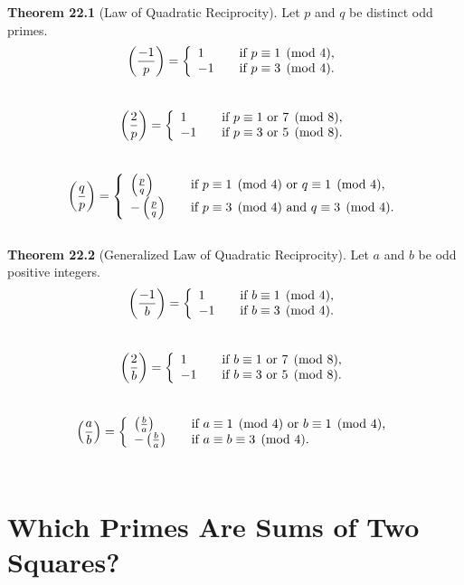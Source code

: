 \documentclass{article}
\begin{document}
\textbf{Theorem 22.1} (Law of Quadratic Reciprocity). Let $p$ and $q$ be distinct odd primes.
\[ \left(\frac{-1}{p}\right)= \left\{
    \begin{array}{l l}
    1 & \quad \text{if $p\equiv 1\pmod4$,}\\
    -1 & \quad \text{if $p\equiv 3\pmod4$.}
    \end{array} \right.\]\\
\[ \left(\frac{2}{p}\right)= \left\{
    \begin{array}{l l}
    1 & \quad \text{if $p\equiv1 \text{ or } 7\pmod 8$,}\\
    -1 & \quad \text{if $p\equiv3 \text{ or } 5\pmod 8$.}
    \end{array} \right.\]\\
\[ \left(\frac{q}{p}\right)= \left\{
    \begin{array}{l l}
    \left(\frac{p}{q}\right) & \quad \text{if $p\equiv1\pmod4 \text{ or } q\equiv1\pmod4$,}\\
    -\left(\frac{p}{q}\right) & \quad \text{if $p\equiv3\pmod4 \text{ and } q\equiv3\pmod4$.}
    \end{array} \right.\]\\
\textbf{Theorem 22.2} (Generalized Law of Quadratic Reciprocity). Let $a$ and $b$ be odd positive integers.
\[ \left(\frac{-1}{b}\right)= \left\{
    \begin{array}{l l}
    1 & \quad \text{if $b\equiv 1\pmod4$,}\\
    -1 & \quad \text{if $b\equiv 3\pmod4$.}
    \end{array} \right.\]\\
\[ \left(\frac{2}{b}\right)= \left\{
    \begin{array}{l l}
    1 & \quad \text{if $b\equiv1 \text{ or } 7\pmod 8$,}\\
    -1 & \quad \text{if $b\equiv3 \text{ or } 5\pmod 8$.}
    \end{array} \right.\]\\
\[ \left(\frac{a}{b}\right)= \left\{
    \begin{array}{l l}
    \left(\frac{b}{a}\right) & \quad \text{if $a\equiv1\pmod4 \text{ or } b\equiv1\pmod4$,}\\
    -\left(\frac{b}{a}\right) & \quad \text{if $a\equiv b\equiv3\pmod4$.}
    \end{array} \right.\]\\

\section{Which Primes Are Sums of Two Squares?}
\end{document}
